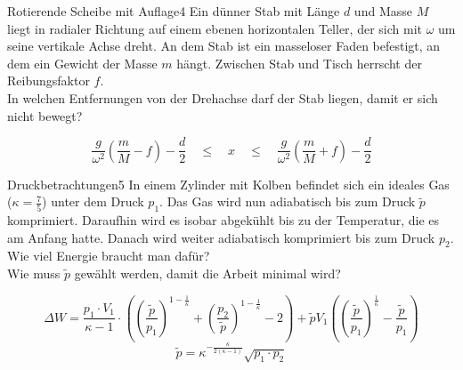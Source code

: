 \begin{problem}{Rotierende Scheibe mit Auflage}{4}
Ein dünner Stab mit Länge $d$ und Masse $M$ liegt in radialer Richtung auf einem ebenen horizontalen Teller, der sich mit $\omega$ um seine vertikale Achse dreht. An dem Stab ist ein masseloser Faden befestigt, an dem ein Gewicht der Masse $m$ hängt. Zwischen Stab und Tisch herrscht der Reibungsfaktor $f$.\\
In welchen Entfernungen von der Drehachse darf der Stab liegen, damit er sich nicht bewegt?
\begin{solution}
\[
\frac{g}{\omega^2}\left(\frac{m}{M}-f\right)-\frac{d}{2}\quad\leq\quad x
\quad\leq\quad\frac{g}{\omega^2}\left(\frac{m}{M}+f\right)-\frac{d}{2}
\]
\end{solution}
\end{problem}


\begin{problem}{Druckbetrachtungen}{5}
In einem Zylinder mit Kolben befindet sich ein ideales Gas ($\kappa=\frac{7}{5}$) unter dem Druck $p_1$. Das Gas wird nun adiabatisch bis zum Druck $\tilde{p}$ komprimiert. Daraufhin wird es isobar abgekühlt bis zu der Temperatur, die es am Anfang hatte. Danach wird weiter adiabatisch komprimiert bis zum Druck $p_2$.\\
Wie viel Energie braucht man dafür?\\
Wie muss $\tilde{p}$ gewählt werden, damit die Arbeit minimal wird?
\begin{solution}
\[
\Delta W =\frac{p_1\cdot V_1}{\kappa-1}\cdot\left(\left(\frac{\tilde{p}}{p_1}\right)^{1-\frac{1}{\kappa}} +\left(\frac{p_2}{\tilde{p}}\right)^{1-\frac{1}{\kappa}}-2\right)
+ \tilde p V_1 \left( \left(\frac{\tilde{p}}{p_1}\right)^{\frac{1}{\kappa}} - \frac{\tilde{p}}{p_1} \right)
\]
\[
\tilde{p} = \kappa^{- \frac{\kappa}{2(\kappa-1)}} \sqrt{p_1\cdot p_2}
\]
\end{solution}
\end{problem}

